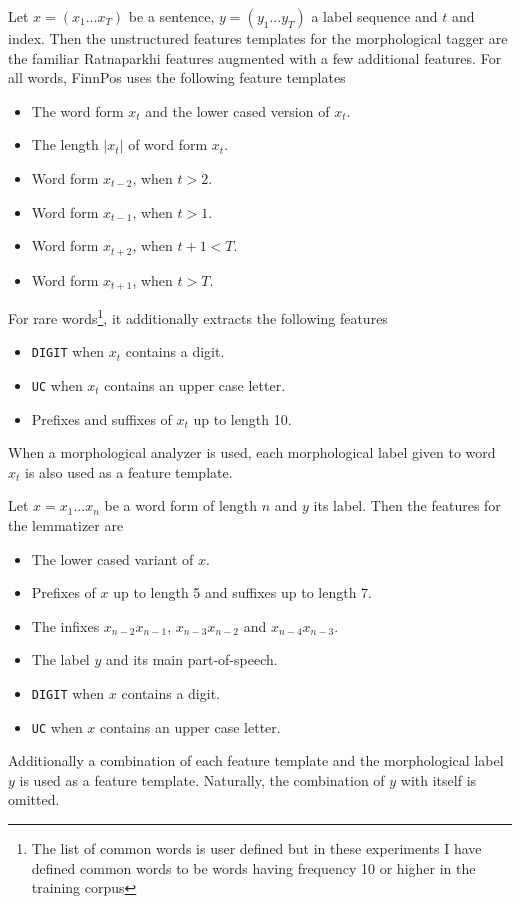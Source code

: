 Let $x = (x_1 ... x_T)$ be a sentence, $y = (y_1 ... y_T)$ a label
sequence and $t$ and index. Then the unstructured features templates
for the morphological tagger are the familiar Ratnaparkhi features
\citep{Ratnaparkhi1998} augmented with a few additional features. For
all words, FinnPos uses the following feature templates
\begin{itemize}
\item The word form $x_t$ and the lower cased version of $x_t$.
\item The length $|x_t|$ of word form $x_t$.
\item Word form $x_{t-2}$, when $t > 2$.
\item Word form $x_{t-1}$, when $t > 1$.
\item Word form $x_{t+2}$, when $t + 1 < T$.
\item Word form $x_{t+1}$, when $t > T$.
\end{itemize}
For rare words\footnote{The list of common words is user defined but
  in these experiments I have defined common words to be words having
  frequency 10 or higher in the training corpus}, it additionally
extracts the following features
\begin{itemize}
\item {\tt DIGIT} when $x_t$ contains a digit.
\item {\tt UC} when $x_t$ contains an upper case letter.
\item Prefixes and suffixes of $x_t$ up to length 10.
\end{itemize}
When a morphological analyzer is used, each morphological label given
to word $x_t$ is also used as a feature template.

Let $x = x_1 ... x_n$ be a word form of length $n$ and $y$ its
label. Then the features for the lemmatizer are
\begin{itemize}
\item The lower cased variant of $x$.
\item Prefixes of $x$ up to length 5 and suffixes up to length 7.
\item The infixes $x_{n - 2}x_{n - 1}$, $x_{n - 3}x_{n - 2}$ and $x_{n - 4}x_{n - 3}$.
\item The label $y$ and its main part-of-speech.
\item {\tt DIGIT} when $x$ contains a digit.
\item {\tt UC} when $x$ contains an upper case letter.
\end{itemize}
Additionally a combination of each feature template and the
morphological label $y$ is used as a feature template. Naturally, the
combination of $y$ with itself is omitted.

